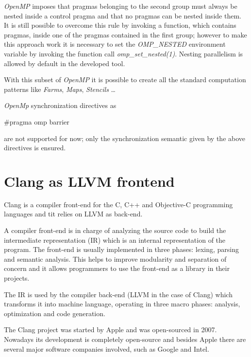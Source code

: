 \documentclass[a4paper,11pt,oneside]{book}
\begin{document}
\emph{OpenMP} imposes that pragmas belonging to the second group must always be nested inside a control pragma and that no pragmas can be nested inside them. It is still possible to overcome this rule by invoking a function, which contains pragmas, inside one of the pragmas contained in the first group; however to make this approach work it is necessary to set the \emph{OMP\_NESTED} environment variable by invoking the function call \emph{omp\_set\_nested(1)}. Nesting parallelism is allowed by default in the developed tool. 

With this subset of \emph{OpenMP} it is possible to create all the standard computation patterns like \emph{Farms}, \emph{Maps}, \emph{Stencils} \dots 

\emph{OpenMp} synchronization directives as \begin{bf}$\#$pragma omp barrier\end{bf} are not supported for now; only the synchronization semantic given by the above directives is ensured. 

\section{Clang as LLVM frontend}

Clang \cite{clang} is a compiler front-end for the C, C++ and Objective-C programming languages and tit relies on LLVM as back-end. 

A compiler front-end is in charge of analyzing the source code to build the intermediate representation (IR) which is an internal representation of the program. The front-end is usually implemented in three phases: lexing, parsing and semantic analysis. This helps to improve modularity and separation of concern and it allows programmers to use the front-end as a library in their projects. 

The IR is used by the compiler back-end (LLVM in the case of Clang) which transforms it into machine language, operating in three macro phases: analysis, optimization and code generation. 

The Clang project was started by Apple and was open-sourced in 2007. Nowadays its development is completely open-source and besides Apple there are several major software companies involved, such as Google and Intel.
\end{document}

